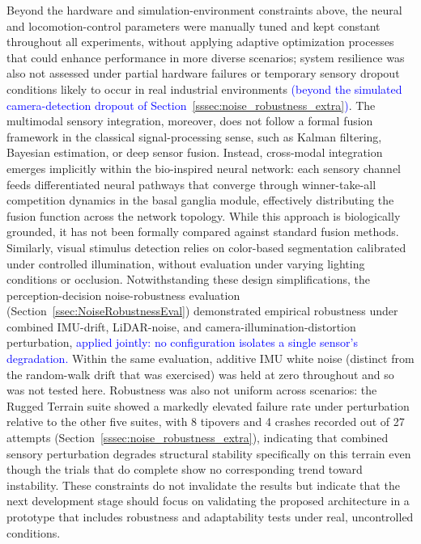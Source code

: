 \documentclass[preprint,12pt]{elsarticle}
\newcommand{\revblue}[1]{\textcolor{blue}{#1}}
\begin{document}
Beyond the hardware and simulation-environment constraints above, the neural and locomotion-control parameters were manually tuned and kept constant throughout all experiments, without applying adaptive optimization processes that could enhance performance in more diverse scenarios; system resilience was also not assessed under partial hardware failures or temporary sensory dropout conditions likely to occur in real industrial environments \revblue{(beyond the simulated camera-detection dropout of Section~\ref{sssec:noise_robustness_extra})}. The multimodal sensory integration, moreover, does not follow a formal fusion framework in the classical signal-processing sense, such as Kalman filtering, Bayesian estimation, or deep sensor fusion. Instead, cross-modal integration emerges implicitly within the bio-inspired neural network: each sensory channel feeds differentiated neural pathways that converge through winner-take-all competition dynamics in the basal ganglia module, effectively distributing the fusion function across the network topology. While this approach is biologically grounded, it has not been formally compared against standard fusion methods. Similarly, visual stimulus detection relies on color-based segmentation calibrated under controlled illumination, without evaluation under varying lighting conditions or occlusion. Notwithstanding these design simplifications, the perception-decision noise-robustness evaluation (Section~\ref{ssec:NoiseRobustnessEval}) demonstrated empirical robustness under combined IMU-drift, LiDAR-noise, and camera-illumination-distortion perturbation, \revblue{applied jointly: no configuration isolates a single sensor's degradation.} Within the same evaluation, additive IMU white noise (distinct from the random-walk drift that was exercised) was held at zero throughout and so was not tested here. Robustness was also not uniform across scenarios: the Rugged Terrain suite showed a markedly elevated failure rate under perturbation relative to the other five suites, with 8 tipovers and 4 crashes recorded out of 27 attempts (Section~\ref{sssec:noise_robustness_extra}), indicating that combined sensory perturbation degrades structural stability specifically on this terrain even though the trials that do complete show no corresponding trend toward instability. These constraints do not invalidate the results but indicate that the next development stage should focus on validating the proposed architecture in a prototype that includes robustness and adaptability tests under real, uncontrolled conditions.
\end{document}
